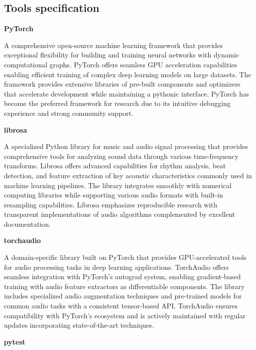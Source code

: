 \documentclass[
    bindingoffset=5mm,  %
    footnoteindent=3mm, %
    hyphenation=true    %
]{src/wut-thesis}
\begin{document}
\subsection{Tools specification} \label{ch:ch3LabelSpec}
\begin{description}
\item \textbf{PyTorch}

A comprehensive open-source machine learning framework that provides exceptional flexibility for building and training neural networks with dynamic computational graphs. PyTorch offers seamless GPU acceleration capabilities enabling efficient training of complex deep learning models on large datasets. The framework provides extensive libraries of pre-built components and optimizers that accelerate development while maintaining a pythonic interface. PyTorch has become the preferred framework for research due to its intuitive debugging experience and strong community support.

\item \textbf{librosa}

A specialized Python library for music and audio signal processing that provides comprehensive tools for analyzing sound data through various time-frequency transforms. Librosa offers advanced capabilities for rhythm analysis, beat detection, and feature extraction of key acoustic characteristics commonly used in machine learning pipelines. The library integrates smoothly with numerical computing libraries while supporting various audio formats with built-in resampling capabilities. Librosa emphasizes reproducible research with transparent implementations of audio algorithms complemented by excellent documentation.

\item \textbf{torchaudio}

A domain-specific library built on PyTorch that provides GPU-accelerated tools for audio processing tasks in deep learning applications. TorchAudio offers seamless integration with PyTorch's autograd system, enabling gradient-based training with audio feature extractors as differentiable components. The library includes specialized audio augmentation techniques and pre-trained models for common audio tasks with a consistent tensor-based API. TorchAudio ensures compatibility with PyTorch's ecosystem and is actively maintained with regular updates incorporating state-of-the-art techniques.

\item \textbf{pytest}


\end{description}
\end{document}
